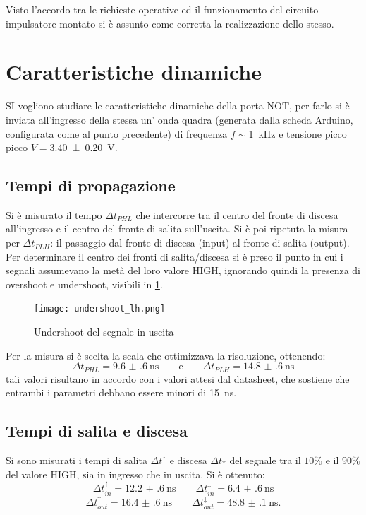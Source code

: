 Visto l'accordo tra le richieste operative ed il funzionamento del circuito impulsatore montato 
si è assunto  come  corretta la realizzazione dello stesso.

\section{Caratteristiche dinamiche}
	SI vogliono studiare le caratteristiche dinamiche della porta NOT, per farlo si è inviata all'ingresso della stessa un' onda quadra (generata dalla scheda Arduino, configurata come al punto precedente) di frequenza  $f\sim$\SI{1}{\kilo \hertz} e tensione picco picco $V=$\SI{3.40 \pm 0.20}{\volt}.

	\subsection{Tempi di propagazione}
	Si è misurato il tempo $\Delta t_{PHL}$ che intercorre tra il centro del fronte di discesa all'ingresso e il centro del fronte di salita sull'uscita. Si è poi ripetuta la misura per $\Delta t_{PLH}$: il passaggio dal fronte di discesa (input) al fronte di salita (output).
	Per determinare il centro dei fronti di salita/discesa si è preso il punto in cui i segnali assumevano la metà del loro valore HIGH, ignorando quindi la presenza di overshoot e undershoot, visibili in \figurename{ \ref{f:ripple}}.

	\begin{figure}[H]
		\centering
		\texttt{[image: undershoot\_lh.png]}
		\caption{Undershoot del segnale in uscita}
		\label{f:ripple}
	\end{figure}
	\noindent Per la misura si è scelta la scala che ottimizzava la risoluzione, ottenendo:
	$$\Delta t_{PHL}=\SI{9.6(6)}{\nano \second} \qquad \text{e} \qquad \Delta t_{PLH}=\SI{14.8(6)}{\nano \second}$$
	tali valori risultano in accordo con i valori attesi dal datasheet, che sostiene che entrambi i parametri debbano essere minori di \SI{15}{\nano \second}.

\subsection{Tempi di salita e discesa}
Si sono misurati i tempi di salita $\Delta t^{\uparrow}$ e discesa $\Delta t^{\downarrow}$ del segnale tra il $10 \% $ e il $90 \% $ del valore HIGH, sia in ingresso che in uscita. Si è ottenuto:
$$ \Delta t_{in}^{\uparrow}=\SI{12.2(6)}{\nano \second} \qquad \Delta t_{in}^{\downarrow}=\SI{6.4(6)}{\nano \second} $$
$$ \Delta t_{out}^{\uparrow}=\SI{16.4(6)}{\nano \second} \qquad \Delta t_{out}^{\downarrow}=\SI{48.8(1)}{\nano \second}.$$

